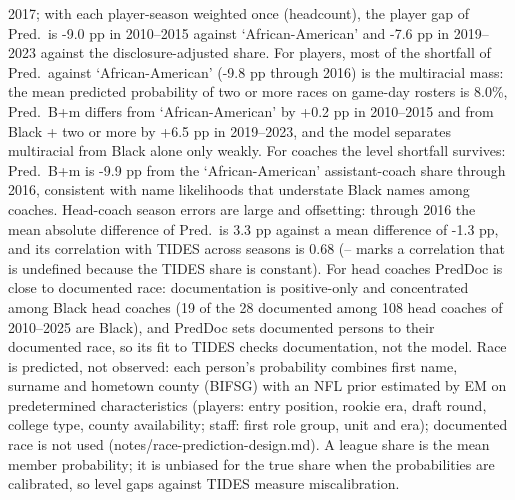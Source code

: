 {2017; with each player-season weighted once (headcount), the player gap of Pred.\ is -9.0 pp in 2010--2015 against `African-American' and -7.6 pp in 2019--2023 against the disclosure-adjusted share. For players, most of the shortfall of Pred.\ against `African-American' (-9.8 pp through 2016) is the multiracial mass: the mean predicted probability of two or more races on game-day rosters is 8.0\%, Pred.\ B+m differs from `African-American' by +0.2 pp in 2010--2015 and from Black + two or more by +6.5 pp in 2019--2023, and the model separates multiracial from Black alone only weakly. For coaches the level shortfall survives: Pred.\ B+m is -9.9 pp from the `African-American' assistant-coach share through 2016, consistent with name likelihoods that understate Black names among coaches. Head-coach season errors are large and offsetting: through 2016 the mean absolute difference of Pred.\ is 3.3 pp against a mean difference of -1.3 pp, and its correlation with TIDES across seasons is 0.68 (-- marks a correlation that is undefined because the TIDES share is constant). For head coaches PredDoc is close to documented race: documentation is positive-only and concentrated among Black head coaches (19 of the 28 documented among 108 head coaches of 2010--2025 are Black), and PredDoc sets documented persons to their documented race, so its fit to TIDES checks documentation, not the model. Race is predicted, not observed: each person's probability combines first name, surname and hometown county (BIFSG) with an NFL prior estimated by EM on predetermined characteristics (players: entry position, rookie era, draft round, college type, county availability; staff: first role group, unit and era); documented race is not used (notes/race-prediction-design.md). A league share is the mean member probability; it is unbiased for the true share when the probabilities are calibrated, so level gaps against TIDES measure miscalibration.
\par}

